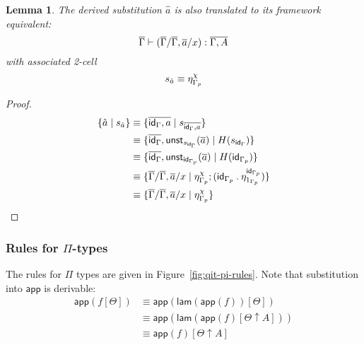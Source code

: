 \documentclass[10pt]{article}
\newtheorem{lemma}{Lemma}
\theoremstyle{definition}
\newcommand{\yields}{\vdash}
\newcommand\UnSt[2]{\ensuremath{\mathsf{unst}_{#1}(#2)}}
\newcommand\TrPlus[2]{\ensuremath{{#1}^+(#2)}}
\newcommand\TrCirc[2]{\ensuremath{{#1}^\circ(#2)}}
\newcommand\var[1]{\ensuremath{\mathsf{var}_{#1}}}
\newcommand{\id}{\mathsf{id}}
\newcommand\bdot[0]{\mathbin{.}}
\begin{document}

\begin{lemma}
The derived substitution $\hat{a}$ is also translated to its framework equivalent: \[\upstairs{\Gamma} \yields (\upstairs{\Gamma}/\upstairs{\Gamma}, \upstairs{a}/x) : \upstairs{\Gamma, A} \]
with associated 2-cell \[s_{\hat{a}} \equiv \eta^\chi_{{\Gamma}_p} \]
\end{lemma}
\begin{proof}
\begin{align*}
\{ \hat{a} \mid s_{\hat{a}} \}
&\equiv \{ \upstairs{\id_\Gamma, a} \mid s_{\upstairs{\id_\Gamma, a}} \} \\
&\equiv \{ \upstairs{\id_\Gamma}, \UnSt{s_{\id_\Gamma}}{\upstairs{a}} \mid H(s_{\id_\Gamma})\} \\
&\equiv \{ \upstairs{\id_\Gamma}, \UnSt{\id_{\asdep\Gamma}}{\upstairs{a}} \mid H(\id_{\asdep\Gamma}) \} \\
&\equiv \{ \upstairs{\Gamma}/\upstairs{\Gamma}, \upstairs{a}/x \mid \eta^\chi_{\asdep{\Gamma}}; (\id_{\asdep\Gamma} \bdot \eta_{1_{\asdep{\Gamma}}}^{\id_{\asdep\Gamma}}) \} \\
&\equiv \{ \upstairs{\Gamma}/\upstairs{\Gamma}, \upstairs{a}/x \mid \eta^\chi_{\asdep{\Gamma}} \}
\end{align*}
\end{proof}

\subsubsection{Rules for $\Pi$-types}


The rules for $\Pi$ types are given in Figure~\ref{fig:qit-pi-rules}. Note that substitution into $\mathsf{app}$ is derivable:
\begin{align*}
\mathsf{app}(f[\Theta])
&\equiv \mathsf{app}(\mathsf{lam}(\mathsf{app}(f))[\Theta]) \\
&\equiv \mathsf{app}(\mathsf{lam}(\mathsf{app}(f)[\Theta \uparrow A])) \\
&\equiv \mathsf{app}(f)[\Theta \uparrow A]
\end{align*}
\end{document}

